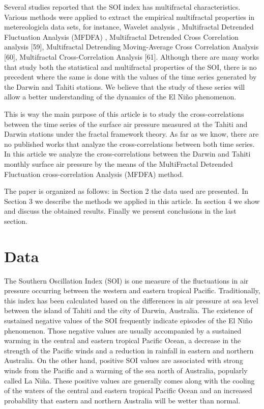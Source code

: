 \documentclass[onecolumn, preprint,aps,amsmath, amssymb, superscriptaddress]{revtex4}
\begin{document}
Several studies reported that the SOI index has multifractal characteristics. Various methods were applied to extract the empirical multifractal properties in metereologicla data sets, for instance, Wavelet analysis \cite{Maruyama_1, Maruyama_2}, Multifractal Detrended Fluctuation Analysis (MFDFA) \cite{Varotsos}, Multifractal Detrended Cross Correlation analysis [59], Multifractal Detrending Moving-Average Cross Correlation Analysis [60], Multifractal Cross-Correlation Analysis [61]. Although there are many works that study both the statistical and multifractal properties of the SOI, there is no precedent where the same is done with the values of the time series generated by the Darwin and Tahiti stations. We believe that the study of these series will allow a better understanding of the dynamics of the El Ni\~no phenomenon.

This is way the main purpose of this article is to study the cross-correlations between the time series of the surface air pressure measured at the Tahiti and Darwin stations under the fractal framework theory. As far as we know, there are no published works that analyze the cross-correlations between both time series. In this article we analyze the cross-correlations between the Darwin and Tahiti monthly surface air pressure by the means of the MultiFractal Detrended Fluctuation cross-correlation Analysis (MFDFA) method.

The paper is organized as follows: in Section 2 the data used are presented. In Section 3 we describe the methods we applied in this article. In section 4 we show and discuss the obtained results. Finally we present conclusions in the last section.

\section{Data}
\label{sec:Data}

The Southern Oscillation Index (SOI) is one measure of the fluctuations in air pressure occurring between the western and eastern tropical Pacific. Traditionally, this index has been calculated based on the differences in air pressure at sea level between the island of Tahiti and the city of Darwin, Australia. The existence of sustained negative values of the SOI frequently indicate episodes of the El Niño phenomenon. Those negative values are usually accompanied by a sustained warming in the central and eastern tropical Pacific Ocean, a decrease in the strength of the Pacific winds and  a reduction in rainfall in eastern and northern Australia.  On the other hand, positive SOI values are associated with strong winds from the Pacific and a warming of the sea north of Australia, popularly called La Niña. These positive values are generally comes along with the cooling of the waters of the central and eastern tropical Pacific Ocean and an increased probability that eastern and northern Australia will be wetter than normal.
\end{document}
